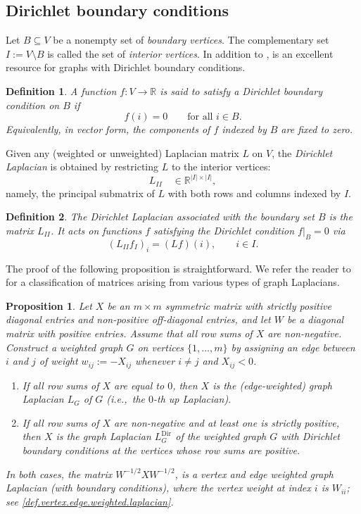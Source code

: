 \documentclass{article}
\newtheorem{proposition}{Proposition}[section]
\newtheorem{definition}{Definition}[section]
\begin{document}
\subsection{Dirichlet boundary conditions}
\label{sec.dir}
Let
$B \subseteq V$ be a nonempty set of \emph{boundary vertices}.
The complementary set $I := V \setminus B$
is called the set of \emph{interior vertices}. In addition to \cite{MR1421568}, \cite[Chamber 0]{MR4383783} is an excellent resource for graphs with Dirichlet boundary conditions.

\begin{definition}
A function $f \colon V \to \mathbb{R}$ is said to satisfy a
\emph{Dirichlet boundary condition} on $B$ if
\[
f(i) = 0 \qquad \text{for all } i \in B.
\]
Equivalently, in vector form, the components of $f$ indexed by $B$
are fixed to zero.
\end{definition}

Given any (weighted or unweighted) Laplacian matrix $L$ on $V$, the \emph{Dirichlet
Laplacian} is obtained by restricting $L$ to the interior vertices:
\[
L_{II}
\quad \in \mathbb{R}^{|I|\times|I|},
\]
namely, the principal submatrix of $L$ with both rows and columns indexed
by $I$.



\begin{definition}
The Dirichlet Laplacian associated with the boundary set $B$ is
the matrix $L_{II}$.
It acts on functions $f$ satisfying the Dirichlet condition
$f|_{B} = 0$ via
\[
(L_{II} f_{I})_i
= (Lf)(i),
\qquad i\in I.
\]
\end{definition}
The proof of the following proposition is straightforward. We refer the reader to \cite{MR4383783} for a classification of matrices arising from various types of graph Laplacians.
\begin{proposition}\label{prop.dualgraph}
Let $X$ be an $m\times m$ symmetric matrix with strictly positive diagonal entries and non-positive off-diagonal entries, and let $W$ be a diagonal matrix with positive entries. Assume that all row sums of $X$ are non-negative. Construct a weighted graph $G$ on vertices $\{1,\dots,m\}$ by assigning an edge between $i$ and $j$ of weight $w_{ij} := -X_{ij}$ whenever $i\neq j$ and $X_{ij}<0$.

\begin{enumerate}
\label{prop.reduce.to.graph.lap}
    \item If all row sums of $X$ are equal to $0$, then $X$ is the (edge-weighted) graph Laplacian $L_G$ of $G$ (i.e.,\ the $0$-th up Laplacian). 
    
    \item If all row sums of $X$ are non-negative and at least one is strictly positive, then $X$ is the graph Laplacian $L^\mathrm{Dir}_G$ of the weighted graph $G$ with Dirichlet boundary conditions at the vertices whose row sums are positive.
\end{enumerate}
In both cases, the matrix $W^{-1/2}XW^{-1/2}$, is a \emph{vertex and edge} weighted graph Laplacian (with boundary conditions), where the vertex weight at index $i$ is $W_{ii}$; see \cref{def.vertex.edge.weighted.laplacian}.
\end{proposition}
\end{document}
